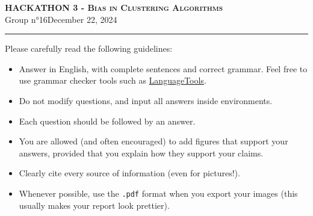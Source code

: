 \documentclass [a4paper, 12pt] {article}
\begin{document}
    \begin{center}
        \Large
        \centering
        \textsc{\textbf{HACKATHON 3 - Bias in Clustering Algorithms}}\\
        \vspace{0.1cm}
         Group n°16\hfill December 22, 2024 \\
       \noindent\hrulefill
    \end{center}
    \vspace*{0.5cm}

    \hspace*{-0.75cm}

    \vspace*{0.5cm}
    
    \hrule
    
    \vspace*{0.5cm}
    
    Please carefully read the following guidelines:
    
    \begin{itemize}
        \item Answer in English, with complete sentences and correct grammar. Feel free to use grammar checker tools such as \href{https://languagetool.org/fr}{LanguageTools}.
        \item Do not modify questions, and input all answers inside  environments.
        \item Each question should be followed by an answer.
        \item You are allowed (and often encouraged) to add figures that support your answers, provided that you explain how they support your claims.
        \item Clearly cite every source of information (even for pictures!).
        \item Whenever possible, use the \texttt{.pdf} format when you export your images (this usually makes your report look prettier).
    \end{itemize}
\end{document}
